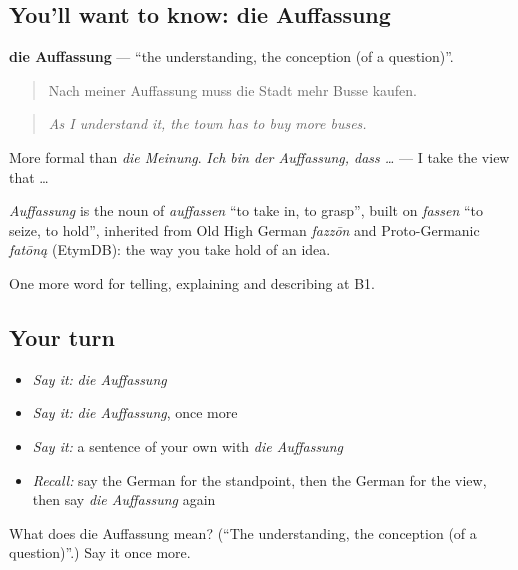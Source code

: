 \subsection*{You'll want to know: die Auffassung}
\textbf{die Auffassung} — \textquotedblleft{}the understanding, the conception (of a question)\textquotedblright{}.

\begin{quote}
Nach meiner Auffassung muss die Stadt mehr Busse kaufen.
\end{quote}

\begin{quote}
\emph{As I understand it, the town has to buy more buses.}
\end{quote}

More formal than \emph{die Meinung}. \emph{Ich bin der Auffassung, dass …} — I take the view that …

\begin{cousinweb}
\emph{Auffassung} is the noun of \emph{auffassen} \textquotedblleft{}to take in, to grasp\textquotedblright{}, built on \emph{fassen} \textquotedblleft{}to seize, to hold\textquotedblright{}, inherited from Old High German \emph{fazzōn} and Proto-Germanic \emph{fatōną} (EtymDB): the way you take hold of an idea.
\end{cousinweb}

\begin{grammarlens}[title={What you've built}]
One more word for telling, explaining and describing at B1.
\end{grammarlens}

\subsection*{Your turn}
\begin{itemize}
\raggedright
  \item \emph{Say it:} \emph{die Auffassung}
  \item \emph{Say it:} \emph{die Auffassung}, once more
  \item \emph{Say it:} a sentence of your own with \emph{die Auffassung}
  \item \emph{Recall:} say the German for the standpoint, then the German for the view, then say \emph{die Auffassung} again
\end{itemize}

\begin{tcolorbox}[breakable,colback=teal!4,colframe=teal!35!black,title={Before you move on}]
What does die Auffassung mean? (\textquotedblleft{}The understanding, the conception (of a question)\textquotedblright{}.) Say it once more.
\end{tcolorbox}
